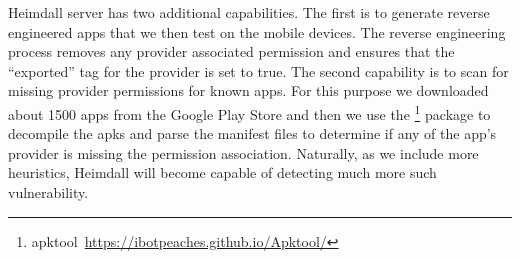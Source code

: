 Heimdall server has two additional capabilities. The first is to generate reverse engineered apps that we then test on the mobile devices. The reverse engineering process removes any provider associated permission and ensures that the ``exported'' tag for the provider is set to true. The second capability is to scan for missing provider permissions for known apps. For this purpose we downloaded about 1500 apps from the Google Play Store and then we use the \footnote{apktool~\url{https://ibotpeaches.github.io/Apktool/}} package to decompile the apks and parse the manifest files to determine if any of the app's provider is missing the permission association. Naturally, as we include more heuristics, Heimdall will become capable of detecting much more such vulnerability.

